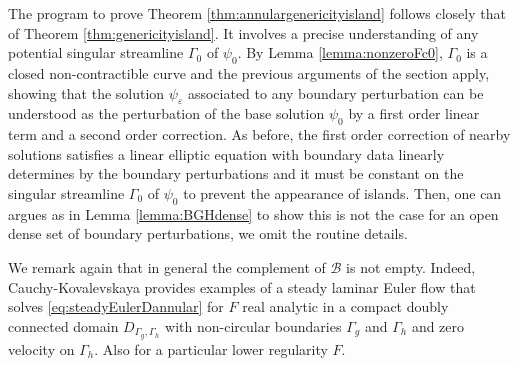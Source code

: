 \documentclass[11pt,reqno]{amsproc}
\newcommand{\ve}{\varepsilon}
\numberwithin{equation}{section}
\numberwithin{theorem}{section}
\numberwithin{prop}{section}
\numberwithin{cor}{section}
\numberwithin{lemma}{section}
\theoremstyle{remark}
\theoremstyle{definition}
\begin{document}
The program to prove Theorem \ref{thm:annulargenericityisland} follows closely that of Theorem \ref{thm:genericityisland}. It involves a precise understanding of any potential singular streamline $\Gamma_0$ of $\psi_0$. By Lemma \ref{lemma:nonzeroFc0}, $\Gamma_0$ is a closed non-contractible curve and the previous arguments of the section apply, showing that the solution $\psi_\ve$ associated to any boundary perturbation can be understood as the perturbation of the base solution $\psi_0$ by a first order linear term and a second order correction. As before, the first order correction of nearby solutions satisfies a linear elliptic equation with boundary data linearly determines by the boundary perturbations and it must be constant on the singular streamline $\Gamma_0$ of $\psi_0$ to prevent the appearance of islands. Then, one can argues as in Lemma \ref{lemma:BGHdense} to show this is not the case for an open dense set of boundary perturbations, we omit the routine details.

We remark again that in general the complement of $\mathcal{B}$ is not empty. Indeed,   Cauchy-Kovalevskaya provides examples of a steady laminar Euler flow that solves \eqref{eq:steadyEulerDannular} for $F$ real analytic in a compact doubly connected domain $D_{\Gamma_g,\Gamma_h}$ with non-circular boundaries $\Gamma_g$ and $\Gamma_h$ and zero velocity on $\Gamma_h$.  Also \cite[Theorem 4.12]{elgindi2024classification}  for a particular lower regularity $F$.
\end{document}
